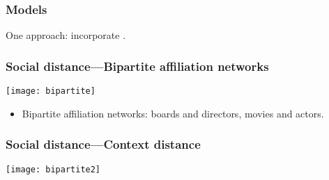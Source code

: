 \begin{frame}
  \frametitle{Models}

  \begin{block}{}
  One approach: incorporate .

  \bigskip


  \bigskip


  \bigskip

  \end{block}

\end{frame}

\begin{frame}
  \frametitle{Social distance---Bipartite affiliation networks}

  \begin{block}{}
  \centering
  \texttt{[image: bipartite]}
  \begin{itemize}
  \item 
    Bipartite affiliation networks: boards and directors, movies and actors.
  \end{itemize}
  \end{block}


\end{frame}



\begin{frame}
  \frametitle{Social distance---Context distance}

  \begin{block}{}
    \centering
    \texttt{[image: bipartite2]}
  \end{block}

\end{frame}

